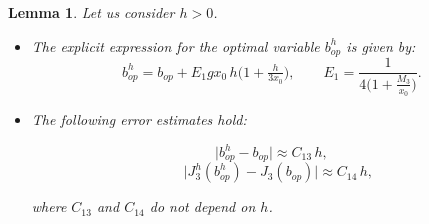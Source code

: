 \documentclass[11pt]{article}
\newtheorem{Lemma}{Lemma}
\begin{document}
\begin{Lemma} Let us consider $h > 0$.
    
     \begin{itemize}
      \item[(a)]  The explicit expression for the optimal variable ${b^h_{op}} $ is given by:     
     \begin{equation}\label{bhop}
      {b^h_{op}} =b_{op} + E_1 g x_0 \,h \Big(1+ \tfrac{h}{3 x_0}\Big), \qquad E_1 = \frac{1}{4 \Big(1+ \tfrac{M_3}{x_0} \Big)  }.
     \end{equation}
     
     \noindent 
     
      \item[(b)] The following error estimates hold:
  
     		\begin{equation}\label{bhop-bop}  
     				      \lvert {b^h_{op}} - b_{op} \rvert \approx C_{13} \, h ,
     				      \end{equation}\label{J3hbop-J3bop}
     				      \begin{equation}     		\quad 		     \Big \lvert  {J^h_{3}}({b^h_{op}}) -  J_3(b_{op}) \Big \rvert \approx C_{14} \, h,
     				      \end{equation}
    		
        where $C_{13}$  and $C_{14}$ do not depend on $h$.
     
     \end{itemize}
    
  \end{Lemma}
\end{document}
